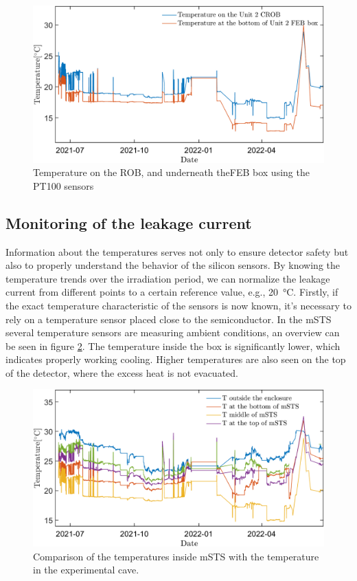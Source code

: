 \begin{figure}[!h]
\centering
\includegraphics[width=0.9\columnwidth]{Chapter6/DCS/images/ROBvsFEB.png}
\caption{Temperature on the \gls{ROB}, and underneath the\gls{FEB} box using the PT100 sensors}
\label{fig_robvsfeb}
\end{figure}

\newpage

\subsection{Monitoring of the leakage current}

Information about the temperatures serves not only to ensure detector safety but also to properly understand the behavior of the silicon sensors. By knowing the temperature trends over the irradiation period, we can normalize the leakage current from different points to a certain reference value, e.g., \SI{20}{\celsius}. Firstly, if the exact temperature characteristic of the sensors is now known, it's necessary to rely on a temperature sensor placed close to the semiconductor. In the \gls{mSTS} several temperature  sensors are measuring ambient conditions, an overview can be seen in figure \ref{fig_temperatures}. The temperature inside the box is significantly lower, which indicates properly working cooling. Higher temperatures are also seen on the top of the detector, where the excess heat is not evacuated. 

\begin{figure}[!h]
\centering
\includegraphics[width=0.9\columnwidth]{Chapter6/DCS/images/rates/tempmSTS.png}
\caption{Comparison of the temperatures inside \gls{mSTS} with the temperature in the experimental cave.}
\label{fig_temperatures}
\end{figure}

